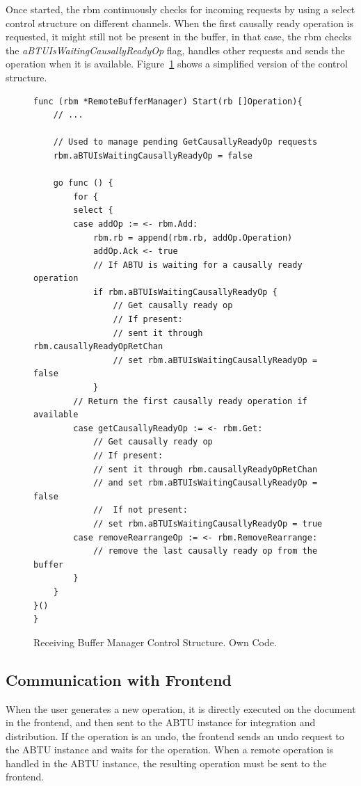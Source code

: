 \documentclass[11pt, a4paper, oneside, openright]{article} %
\begin{document}
Once started, the rbm continuously checks for incoming requests by using a select control structure on different channels. When the first causally ready operation is requested, it might still not be present in the buffer, in that case, the rbm checks the \textit{aBTUIsWaitingCausallyReadyOp} flag, handles other requests and sends the operation when it is available. Figure~\ref{code:rbm2} shows a simplified version of the control structure.

\begin{figure}[!h]
\begin{center}
\begin{lstlisting}
func (rbm *RemoteBufferManager) Start(rb []Operation){
	// ...

	// Used to manage pending GetCausallyReadyOp requests
	rbm.aBTUIsWaitingCausallyReadyOp = false

	go func () {
		for {
		select {
		case addOp := <- rbm.Add:
			rbm.rb = append(rbm.rb, addOp.Operation)
			addOp.Ack <- true
			// If ABTU is waiting for a causally ready operation
			if rbm.aBTUIsWaitingCausallyReadyOp {
				// Get causally ready op
				// If present:
				// sent it through rbm.causallyReadyOpRetChan
				// set rbm.aBTUIsWaitingCausallyReadyOp = false
			}
		// Return the first causally ready operation if available
		case getCausallyReadyOp := <- rbm.Get:
			// Get causally ready op
			// If present:
			// sent it through rbm.causallyReadyOpRetChan
			// and set rbm.aBTUIsWaitingCausallyReadyOp = false
			//  If not present:
			// set rbm.aBTUIsWaitingCausallyReadyOp = true
		case removeRearrangeOp := <- rbm.RemoveRearrange:
			// remove the last causally ready op from the buffer
		}
	}
}()
}
\end{lstlisting}
\end{center}
\caption{Receiving Buffer Manager Control Structure. Own Code.\label{code:rbm2}}
\end{figure}



\subsection{Communication with Frontend}

When the user generates a new operation, it is directly executed on the document in the frontend, and then sent to the ABTU instance for integration and distribution. If the operation is an undo, the frontend sends an undo request to the ABTU instance and waits for the operation. When a remote operation is handled in the ABTU instance, the resulting operation must be sent to the frontend.
\end{document}

